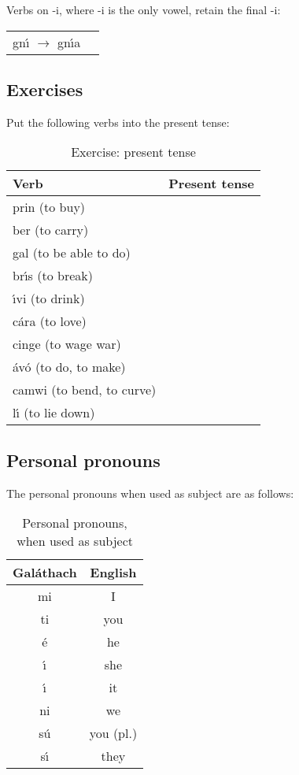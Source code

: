 \noindent Verbs on -i, where -i is the only vowel, retain the final -i:
\begin{table}[H]
\begin{tabu}{ll}
  gn\'{\i} $\rightarrow$ gn\'{\i}a
\end{tabu}
\label{examples_verbs_on_i_only_vowel}
\end{table}

\subsection{Exercises}
\noindent Put the following verbs into the present tense:
\begin{table}[H]
\centering
\begin{tabu}{|l|p{10.0cm}|}
  \toprule
  \textbf{Verb} & \textbf{Present tense}\\
  \toprule
  prin (to buy) & \\
  \midrule
  ber (to carry) & \\
  \midrule
  gal (to be able to do) & \\
  \midrule
  br\'{\i}s (to break) & \\
  \midrule
  \'{\i}vi (to drink) & \\
  \midrule
  c\'{a}ra (to love) & \\
  \midrule
  cinge (to wage war) & \\
  \midrule
  \'{a}v\'{o} (to do, to make) & \\
  \midrule
  camwi (to bend, to curve) & \\
  \midrule
  l\'{\i} (to lie down) & \\
  \bottomrule
\end{tabu}
\caption{Exercise: present tense}
\label{exercise_present_tense}
\end{table}

\subsection{Personal pronouns}

\noindent The personal pronouns when used as subject are as follows:
\begin{table}[H]
\centering
\begin{tabu}{c|c}
  \textbf{Gal\'{a}thach} & \textbf{English}\\
  \toprule
  mi & I \\
  ti & you\\
  \'{e} & he\\
  \'{\i} & she\\
  \'{\i} & it\\
  ni & we\\
  s\'{u} & you (pl.)\\
  s\'{\i} & they\\
\end{tabu}
\caption{Personal pronouns, when used as subject}
\label{personal_pronouns_as_subject}
\end{table}

